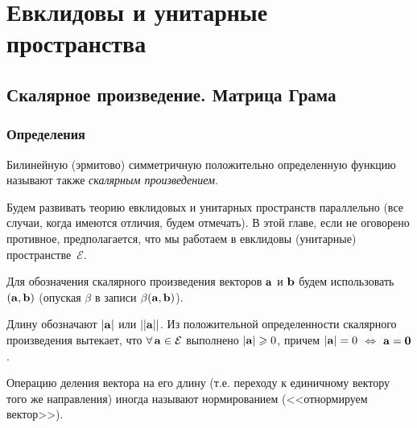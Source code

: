 \chapter{Евклидовы и унитарные пространства}\label{evkl_prostr}



\section{Скалярное произведение. Матрица Грама}%

\subsection{Определения}

Билинейную (эрмитово) симметричную положительно
определенную функцию называют также {\it скалярным произведением}.



Будем развивать теорию евклидовых и унитарных пространств параллельно (все случаи, когда
имеются отличия, будем отмечать). В этой главе, если не оговорено противное, 
предполагается, что мы работаем в евклидовы (унитарные) пространстве~$\mathcal{E}$.


Для обозначения скалярного произведения векторов $\mathbf{a}$ и $\mathbf{b}$
будем использовать $(\mathbf{a},\mathbf{b})$ (опуская $\beta$ в записи $\beta(\mathbf{a}, \mathbf{b})$).



Длину обозначают $|\mathbf{a}|$ или $||\mathbf{a}||$.
Из положительной определенности скалярного произведения
вытекает, что $\forall \, \mathbf{a} \in \mathcal{E}$ выполнено
$|\mathbf{a}|\geqslant 0$, причем $|\mathbf{a}|= 0$
$\Leftrightarrow$ $\mathbf{a} = \mathbf{0}$.

Операцию деления вектора на его длину (т.е. переходу к единичному вектору того же направления)
иногда называют нормированием (<<отнормируем вектор>>).



